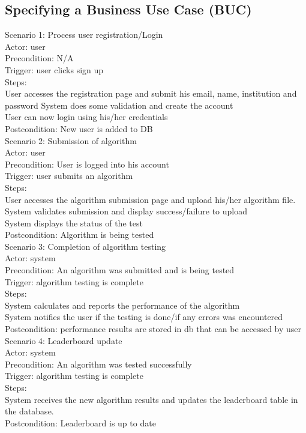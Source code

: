 \documentclass[12pt]{article}
\begin{document}
\subsection{Specifying a Business Use Case (BUC)}
Scenario 1: Process user registration/Login \\
	Actor: user \\
	Precondition: N/A \\
	Trigger: user clicks sign up \\
	Steps: \\
User accesses the registration page and submit his email, name, institution and password
System does some validation and create the account \\
User can now login using his/her credentials \\
	Postcondition: New user is added to DB \\

	Scenario 2: Submission of algorithm \\
	Actor: user \\
	Precondition: User is logged into his account \\
	Trigger: user submits an algorithm \\
	Steps: \\
User accesses the algorithm submission page and upload his/her algorithm file. \\
System validates submission and display success/failure to upload \\
System displays the status of the test \\
	Postcondition: Algorithm is being tested \\

Scenario 3: Completion of algorithm testing \\
Actor: system \\
	Precondition: An algorithm was submitted and is being tested \\
	Trigger: algorithm testing is complete \\
	Steps: \\
System calculates and reports the performance of the algorithm \\
System notifies the user if the testing is done/if any errors was encountered \\
	Postcondition: performance results are stored in db that can be accessed by user \\

Scenario 4: Leaderboard update \\
Actor: system \\
	Precondition: An algorithm was tested successfully \\
	Trigger: algorithm testing is complete \\
	Steps: \\
System receives the new algorithm results and updates the leaderboard table in the database. \\
	Postcondition: Leaderboard is up to date \\
\end{document}

